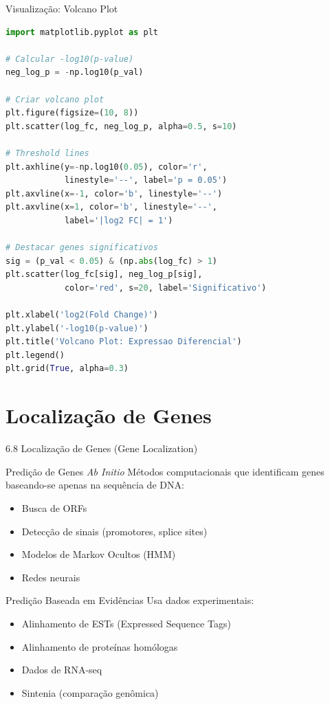 \begin{frame}[fragile, shrink=5]{Visualização: Volcano Plot}
\begin{lstlisting}[language=Python, caption=Volcano plot para DE genes, basicstyle=\ttfamily\tiny]
import matplotlib.pyplot as plt

# Calcular -log10(p-value)
neg_log_p = -np.log10(p_val)

# Criar volcano plot
plt.figure(figsize=(10, 8))
plt.scatter(log_fc, neg_log_p, alpha=0.5, s=10)

# Threshold lines
plt.axhline(y=-np.log10(0.05), color='r',
            linestyle='--', label='p = 0.05')
plt.axvline(x=-1, color='b', linestyle='--')
plt.axvline(x=1, color='b', linestyle='--',
            label='|log2 FC| = 1')

# Destacar genes significativos
sig = (p_val < 0.05) & (np.abs(log_fc) > 1)
plt.scatter(log_fc[sig], neg_log_p[sig],
            color='red', s=20, label='Significativo')

plt.xlabel('log2(Fold Change)')
plt.ylabel('-log10(p-value)')
plt.title('Volcano Plot: Expressao Diferencial')
plt.legend()
plt.grid(True, alpha=0.3)
\end{lstlisting}
\end{frame}

\section{Localização de Genes}

\begin{frame}[shrink=10]{6.8 Localização de Genes (Gene Localization)}
\begin{block}{Predição de Genes \textit{Ab Initio}}
Métodos computacionais que identificam genes baseando-se apenas na sequência de DNA:

\begin{itemize}
    \item Busca de ORFs
    \item Detecção de sinais (promotores, splice sites)
    \item Modelos de Markov Ocultos (HMM)
    \item Redes neurais
\end{itemize}
\end{block}

\vspace{0.3cm}

\begin{block}{Predição Baseada em Evidências}
Usa dados experimentais:
\begin{itemize}
    \item Alinhamento de ESTs (Expressed Sequence Tags)
    \item Alinhamento de proteínas homólogas
    \item Dados de RNA-seq
    \item Sintenia (comparação genômica)
\end{itemize}
\end{block}
\end{frame}

